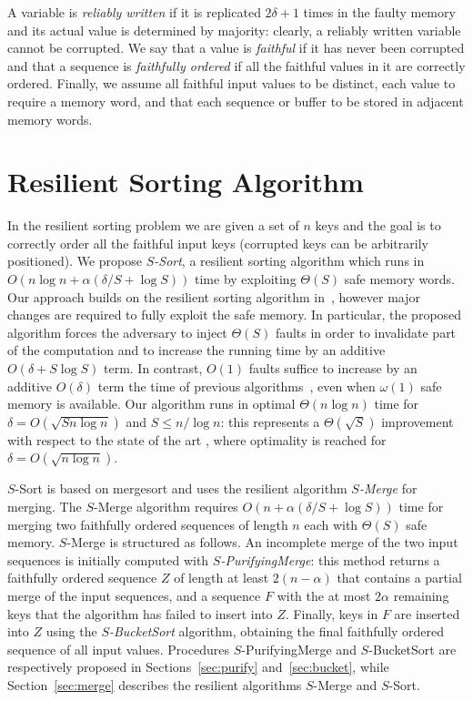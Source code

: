 \documentclass[review,number]{elsarticle}
\newcommand{\BO}[1]{{O}\left(#1\right)}
\newcommand{\BT}[1]{{\Theta}\left(#1\right)}
\newcommand{\F}{{F}}
\newcommand{\SMerge}{$S$-\textsf{Merge}}
\newcommand{\SSort}{$S$-\textsf{Sort}}
\newcommand{\SPurifyingMerge}{$S$-\textsf{PurifyingMerge}}
\newcommand{\SBucketSort}{$S$-\textsf{BucketSort}}
\begin{document}
A variable is \emph{reliably written} if it is replicated $2\delta+1$ times in
the faulty memory and its actual value is determined by majority: clearly, a
reliably written variable cannot be corrupted. We say that a value is
\emph{faithful} if it has never been corrupted and that a sequence is
\emph{faithfully ordered} if all the faithful values in it are correctly
ordered. Finally, we assume all faithful input values to be distinct, each
value to require a memory word, and that each sequence or buffer to be stored
in adjacent memory words. 



\section{Resilient Sorting Algorithm}\label{sec:sort}

In the resilient sorting problem we are given a set of $n$ keys and the goal is
to correctly order all the faithful input keys (corrupted keys can be
arbitrarily positioned). We propose \emph{\SSort{}}, a resilient sorting
algorithm which runs in $\BO{n\log n+\alpha \left(\delta/S+\log S \right)}$ time
by exploiting $\BT{S}$ safe memory words. Our approach builds on the
resilient sorting algorithm in~\cite{FGI09}, however major changes are required
to fully exploit the safe memory. In particular, the proposed algorithm
forces the adversary to inject $\BT{S}$ faults in order to invalidate part of
the computation and to increase the running time by an additive
$\BO{\delta + S \log S}$ term. In contrast, $\BO{1}$ faults suffice to increase
by an additive $\BO{\delta}$ term the time of previous
algorithms~\cite{FI08,FGI09,KT12}, even when $\omega(1)$ safe memory is
available.
Our algorithm  runs in optimal $\BT{n \log n}$ time for
$\delta= \BO{\sqrt{S n\log n}}$ and $S\leq n/\log n$: this represents a 
$\BT{\sqrt{S}}$ improvement with respect to the state of the art
\cite{FGI09}, where optimality is reached for $\delta=\BO{\sqrt{n\log n}}$.

\SSort{} is based on mergesort and uses the resilient algorithm \emph{\SMerge{}}
for merging. The \SMerge{} algorithm requires $\BO{n+\alpha\left(\delta/S+\log
S\right)}$ time for merging two faithfully ordered sequences of length $n$ each
with $\BT{S}$ safe memory. \SMerge{} is structured as follows. An incomplete
merge of the two input sequences is initially computed with
\emph{\SPurifyingMerge{}}: this method returns a faithfully ordered sequence $Z$
of length at least $2(n-\alpha)$ that contains a partial merge of the input
sequences, and a sequence $\F$ with the at most $2\alpha$ remaining keys that
the algorithm has failed to insert into $Z$. Finally, keys in $\F$ are
inserted into $Z$ using the \emph{\SBucketSort{}} algorithm,
obtaining the final faithfully ordered sequence of all input values. 
Procedures \SPurifyingMerge{} and \SBucketSort{} are respectively
proposed in Sections~\ref{sec:purify} and~\ref{sec:bucket}, while
Section~\ref{sec:merge} describes the resilient algorithms \SMerge{} and
\SSort{}.
\end{document}
